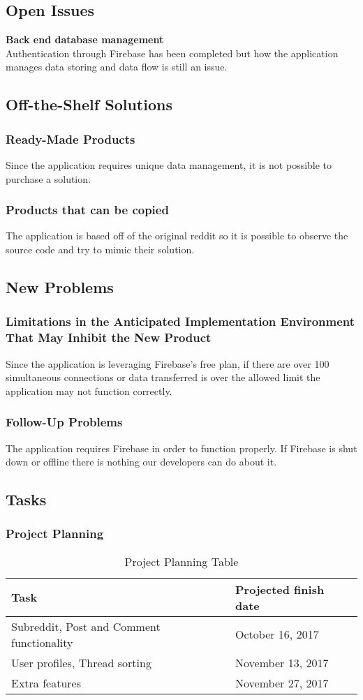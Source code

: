 \documentclass[12pt,fleqn]{article}
\begin{document}
\subsection {Open Issues}
\textbf{Back end database management} \\
Authentication through Firebase has been completed but how the application manages data storing and data flow is still an issue.

\subsection {Off-the-Shelf Solutions}
\subsubsection{Ready-Made Products}
Since the application requires unique data management, it is not possible to purchase a solution.
\subsubsection{Products that can be copied}
The application is based off of the original reddit so it is possible to observe the source code and try to mimic their solution.

\subsection {New Problems}
\subsubsection {Limitations in the Anticipated Implementation
Environment That May Inhibit the New Product}
Since the application is leveraging Firebase's free plan, if there are over 100 simultaneous connections or data transferred is over the allowed limit the application may not function correctly.
\subsubsection {Follow-Up Problems}
The application requires Firebase in order to function properly. If Firebase is shut down or offline there is nothing our developers can do about it.
\subsection {Tasks}
\subsubsection{Project Planning}
\begin{table}[H]
\begin{tabular}{ |p{10cm}| p{6cm}| }
\hline
Task & Projected finish date \\
\hline
Subreddit, Post and Comment functionality & October 16, 2017 \\
\hline
User profiles, Thread sorting & November 13, 2017 \\
\hline
Extra features & November 27, 2017 \\
\hline
\end{tabular}
\caption{Project Planning Table} \label{tab:project planning}
\end{table}
\end{document}
